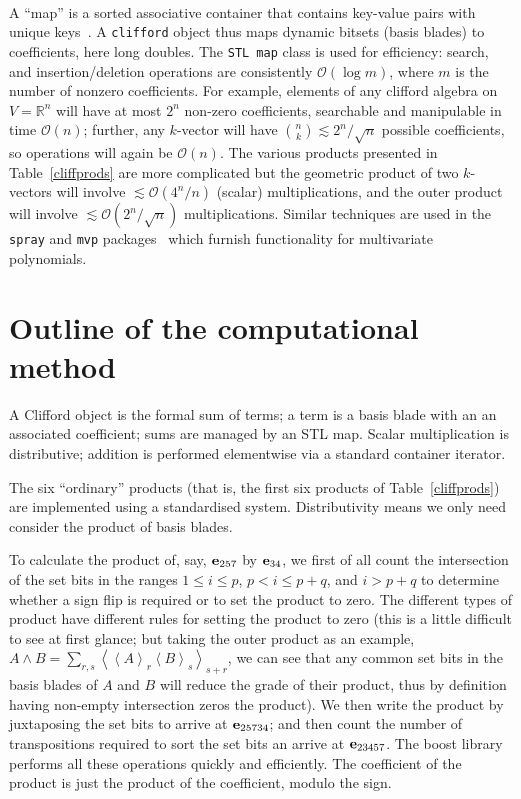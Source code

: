 \documentclass{birkjour}
\theoremstyle{definition}
\theoremstyle{remark}
\numberwithin{equation}{section}
\begin{document}
{\ }\\[10pt]

A ``map'' is a sorted associative container that contains key-value
pairs with unique keys~\cite{musser2009}.  A {\tt clifford} object
thus maps dynamic bitsets (basis blades) to coefficients, here long
doubles.  {The {\tt STL map} class is used for
  efficiency: search, and insertion/deletion operations are
  consistently $\mathcal{O}(\log m)$, where $m$ is the number of
  nonzero coefficients.  For example, elements of any clifford algebra
  on $V=\mathbb{R}^n$ will have at most $2^n$ non-zero coefficients,
  searchable and manipulable in time $\mathcal{O}(n)$; further, any
  $k$-vector will have ${n\choose k}\lesssim 2^n/\sqrt{n}$ possible
  coefficients, so operations will again be $\mathcal{O}(n)$.  The
  various products presented in Table~\ref{cliffprods} are more
  complicated but the geometric product of two $k$-vectors will
  involve $\lesssim\mathcal{O}(4^n/n)$ (scalar) multiplications, and
  the outer product will involve $\lesssim\mathcal{O}(2^n/\sqrt{n})$
  multiplications.}  Similar techniques are used in the {\tt spray}
and {\tt mvp} packages~\cite{hankin2022_mvp,hankin2022_spray} which
furnish functionality for multivariate polynomials.

\section{Outline of the computational method}

A Clifford object is the formal sum of terms; a term is a basis blade
with an an associated coefficient; sums are managed by an STL map.
Scalar multiplication is distributive; addition is performed
elementwise via a standard container iterator.

The six ``ordinary'' products (that is, the first six products of
Table~\ref{cliffprods}) are implemented using a standardised system.
Distributivity means we only need consider the product of basis
blades.

To calculate the product of, say, ${\bf e}_{257}$ by ${\bf e}_{34}$, we first of
all count the intersection of the set bits in the ranges $1\leqslant
i\leqslant p$, $p<i\leqslant p+q$, and $i >p+q$ to determine whether a sign flip
is required or to set the product to zero.  The different types of
product have different rules for setting the product to zero (this is
a little difficult to see at first glance; but taking the outer
product as an example, $\displaystyle A\wedge
B=\sum_{r,s}\left\langle\left\langle A\right\rangle_r\left\langle
B\right\rangle_s\right\rangle_{s+r}$, we can see that any common set
bits in the basis blades of $A$ and $B$ will reduce the grade of their
product, thus by definition having non-empty intersection zeros the
product).  We then write the product by juxtaposing the set bits to
arrive at ${\bf e}_{25734}$; and then count the number of transpositions
required to sort the set bits an arrive at ${\bf e}_{23457}$.  The boost
library performs all these operations quickly and efficiently.  The
coefficient of the product is just the product of the coefficient,
modulo the sign.
\end{document}
